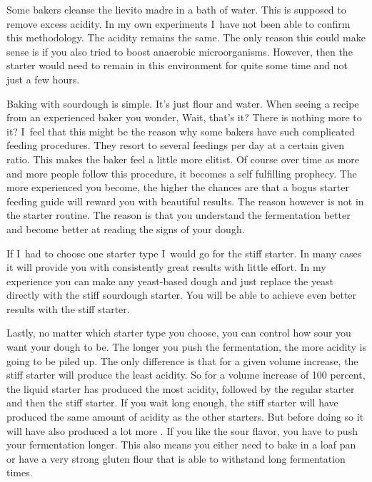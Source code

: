 Some bakers cleanse the lievito madre in a bath of water. This is supposed to
remove excess acidity. In my own experiments I~have not been able to confirm
this methodology. The acidity remains the same. The only reason this could
make sense is if you also tried to boost anaerobic microorganisms. However, then the
starter would need to remain in this environment for quite some time and not just
a few hours.

Baking with sourdough is simple. It's just flour and water. When seeing a recipe
from an experienced baker you wonder, Wait, that's it? There is nothing more
to it? I~feel that this might be the reason why some bakers have such complicated
feeding procedures. They resort to several feedings per day at a certain given ratio.
This makes the baker feel a little more elitist. Of course over time as
more and more people follow this procedure, it becomes a self fulfilling prophecy.
The more experienced you become, the higher the chances are that a bogus starter
feeding guide will reward you with beautiful results. The reason however is
not in the starter routine. The reason is that you understand the fermentation better
and become better at reading the signs of your dough.

If I~had to choose one starter type I~would go for the stiff starter. In many cases
it will provide you with consistently great results with little effort.
In my experience you can make any yeast-based dough and just replace
the yeast directly with the stiff sourdough starter. You will be able
to achieve even better results with the stiff starter.

Lastly, no matter which starter type you choose, you can control how sour
you want your dough to be. The longer you push the fermentation, the more
acidity is going to be piled up. The only difference is that for a given
volume increase, the stiff starter will produce the least acidity. So for a
volume increase of 100 percent, the liquid starter has produced the most acidity,
followed by the regular starter and then the stiff starter. If you wait long
enough, the stiff starter will have produced the same amount of acidity as the
other starters. But before doing so it will have also produced a lot more . If
you like the sour flavor, you have to push your fermentation longer. This also
means you either need to bake in a loaf pan or have a very strong gluten flour
that is able to withstand long fermentation times.
